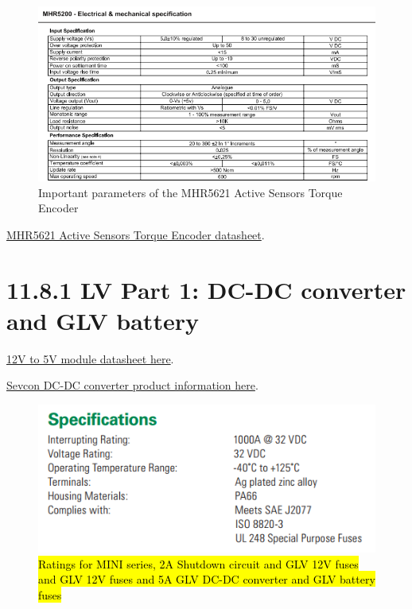 \documentclass{article}
\DeclareRobustCommand{\hlr}[1]{{\sethlcolor{red}\hl{#1}}}
\begin{document}
\begin{figure}[H]
    \centering
    \includegraphics[width = 0.6 \textwidth]{activesensorsnip}
    \caption{Important parameters of the MHR5621 Active Sensors Torque Encoder}
    \label{torquesnip}
\end{figure}

\href{http://www.magni-tec.com/datasheet/WS-MHR5200.pdf}{MHR5621 Active Sensors Torque Encoder datasheet}.

\section*{11.8.1 LV Part 1: DC-DC converter and GLV battery}

\href{https://www.superbrightleds.com/moreinfo/bar-strip-accessories/12vdc-to-5vdc-voltage-converter-/1549/3652/#/tab/Specifications}{12V to 5V module datasheet here}.

\href{http://www.evdrives.com/product_p/vr-sevcon-7213.htm}{Sevcon DC-DC converter product information here}.

\begin{figure}[H]
    \centering
    \includegraphics[width = 0.6 \textwidth]{shutdownfuseratings}
    \caption{\hlr{Ratings for MINI series, 2A Shutdown circuit and GLV 12V fuses and GLV 12V fuses and 5A GLV DC-DC converter and GLV battery fuses}}
    \label{shutdownfuseratings}
\end{figure}
\end{document}
